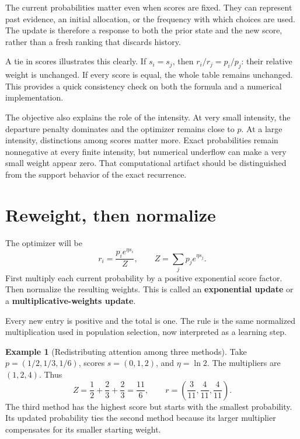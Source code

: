 \documentclass[11pt,oneside,openany]{book}
\theoremstyle{definition}
\newtheorem{example}{Example}[chapter]
\theoremstyle{remark}
\numberwithin{equation}{chapter}
\begin{document}
The current probabilities matter even when scores are fixed. They can represent past evidence, an initial allocation, or the frequency with which choices are used. The update is therefore a response to both the prior state and the new score, rather than a fresh ranking that discards history.

A tie in scores illustrates this clearly. If \(s_i=s_j\), then \(r_i/r_j=p_i/p_j\): their relative weight is unchanged. If every score is equal, the whole table remains unchanged. This provides a quick consistency check on both the formula and a numerical implementation.

The objective also explains the role of the intensity. At very small intensity, the departure penalty dominates and the optimizer remains close to \(p\). At a large intensity, distinctions among scores matter more. Exact probabilities remain nonnegative at every finite intensity, but numerical underflow can make a very small weight appear zero. That computational artifact should be distinguished from the support behavior of the exact recurrence.

\section{Reweight, then normalize}\label{ch09-reweight-then-normalize}

The optimizer will be \[\boxed{r_i=\frac{p_i e^{\eta s_i}}{Z},\qquad
Z=\sum_j p_j e^{\eta s_j}.}\] First multiply each current probability by a positive exponential score factor. Then normalize the resulting weights. This is called an \textbf{exponential update} or a \textbf{multiplicative-weights update}.

Every new entry is positive and the total is one. The rule is the same normalized multiplication used in population selection, now interpreted as a learning step.

\begin{example}[Redistributing attention among three methods]

Take \(p=(1/2,1/3,1/6)\), scores \(s=(0,1,2)\), and \(\eta=\ln2\). The multipliers are \((1,2,4)\). Thus \[Z=\frac12+\frac23+\frac23=\frac{11}6,\qquad
r=\left(\frac3{11},\frac4{11},\frac4{11}\right).\] The third method has the highest score but starts with the smallest probability. Its updated probability ties the second method because its larger multiplier compensates for its smaller starting weight.

\end{example}
\end{document}
